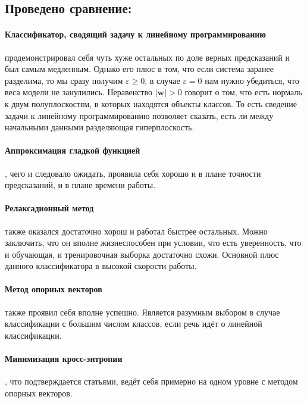 \documentclass[a4paper]{article}
\newcommand{\w}{\bm{w}}
\begin{document}
\subsection{Проведено сравнение:}

\paragraph{Классификатор, сводящий задачу к линейному программированию}продемонстрировал себя чуть хуже остальных по доле верных предсказаний и был самым медленным. Однако его плюс в том, что если система заранее разделима, то мы сразу получим $\varepsilon \geq 0$, в случае $\varepsilon=0$ нам нужно убедиться, что веса модели не занулились. Неравенство $|\w| > 0$ говорит о том, что есть нормаль к двум полуплоскостям, в которых находятся объекты классов. То есть сведение задачи к линейному программированию позволяет сказать, есть ли между начальными данными разделяющая гиперплоскость.

\paragraph{Аппроксимация гладкой функцией}, чего и следовало ожидать, проявила себя хорошо и в плане точности предсказаний, и в плане времени работы. 

\paragraph{Релаксадионный метод} также оказался достаточно хорош и работал быстрее остальных. Можно заключить, что он вполне жизнеспособен при условии, что есть уверенность, что и обучающая, и тренировочная выборка достаточно схожи. Основной плюс данного классификатора в высокой скорости работы.

\paragraph{Метод опорных векторов} также проявил себя вполне успешно. Является разумным выбором в случае классификации с большим числом классов, если речь идёт о линейной классификации.

\paragraph{Минимизация кросс-энтропии}, что подтверждается статьями, ведёт себя примерно на одном уровне с методом опорных векторов.

\newpage
\end{document}

